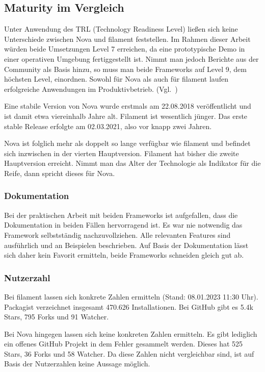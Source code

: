 \subsection{Maturity im Vergleich}
Unter Anwendung des TRL (Technology Readiness Level) ließen sich keine Unterschiede zwischen Nova und filament feststellen.
Im Rahmen dieser Arbeit würden beide Umsetzungen Level 7 erreichen, da eine prototypische Demo in einer operativen Umgebung fertiggestellt ist.
Nimmt man jedoch Berichte aus der Community als Basis hinzu, so muss man beide Frameworks auf Level 9, dem höchsten Level, einordnen.
Sowohl für Nova als auch für filament laufen erfolgreiche Anwendungen im Produktivbetrieb.
(Vgl.~\cite{technology-readiness})

Eine stabile Version von Nova wurde erstmals am 22.08.2018\cite{nova-releases} veröffentlicht und ist damit etwa viereinhalb Jahre alt.
Filament ist wesentlich jünger.
Das erste stable Release erfolgte am 02.03.2021\cite{filament-releases}, also vor knapp zwei Jahren.

Nova ist folglich mehr als doppelt so lange verfügbar wie filament und befindet sich inzwischen in der vierten Hauptversion\cite{nova-releases}.
Filament hat bisher die zweite Hauptversion\cite{filament-releases} erreicht.
Nimmt man das Alter der Technologie als Indikator für die Reife, dann spricht dieses für Nova.

\subsubsection{Dokumentation}
Bei der praktischen Arbeit mit beiden Frameworks ist aufgefallen, dass die Dokumentation in beiden Fällen hervorragend ist.
Es war nie notwendig das Framework selbstständig nachzuvollziehen.
Alle relevanten Features sind ausführlich und an Beispielen beschrieben.
Auf Basis der Dokumentation lässt sich daher kein Favorit ermitteln, beide Frameworks schneiden gleich gut ab.

\subsubsection{Nutzerzahl}
Bei filament lassen sich konkrete Zahlen ermitteln (Stand: 08.01.2023 11:30 Uhr).
Packagist verzeichnet insgesamt 470.626 Installationen.
Bei GitHub gibt es 5.4k Stars, 795 Forks und 91 Watcher.

Bei Nova hingegen lassen sich keine konkreten Zahlen ermitteln.
Es gibt lediglich ein offenes GitHub Projekt in dem Fehler gesammelt werden.
Dieses hat 525 Stars, 36 Forks und 58 Watcher.
Da diese Zahlen nicht vergleichbar sind, ist auf Basis der Nutzerzahlen keine Aussage möglich.

